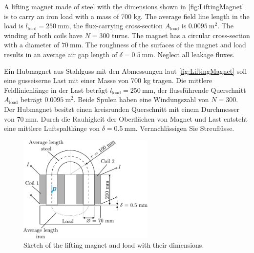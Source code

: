 

A lifting magnet made of steel with the dimensions shown in \autoref{fig:LiftingMagnet} is to carry an iron load with a mass of 700 kg. The average field line length in the load is $l_{\mathrm{load}} = \SI{250}{\milli\metre}$, the flux-carrying cross-section $A_{\mathrm{load}}$ is $\SI{0.0095}{\metre^2}$. The winding of both coils have ${N = 300}$ turns. The magnet has a circular cross-section with a diameter of $\SI{70}{\milli\metre}$. The roughness of the surfaces of the magnet and load results in an average air gap length of $\delta = \SI{0.5}{\milli\metre}$. Neglect all leakage fluxes.





\begin{germanblock}
    Ein Hubmagnet aus Stahlguss mit den Abmessungen laut \autoref{fig:LiftingMagnet} soll eine gusseiserne Last mit einer Masse von 700 kg tragen. Die mittlere Feldlinienlänge in der Last beträgt $l_{\mathrm{load}} = \SI{250}{\milli\metre}$, der flussführende Querschnitt $A_{\mathrm{load}}$ beträgt $\SI{0,0095}{\metre^2}$. Beide Spulen haben eine Windungszahl von ${N = 300}$. Der Hubmagnet besitzt einen kreisrunden Querschnitt mit einem Durchmesser von $\SI{70}{\milli\metre}$. Durch die Rauhigkeit der Oberflächen von Magnet und Last entsteht eine mittlere Luftspaltlänge von $\delta = \SI{0,5}{\milli\metre}$. Vernachlässigen Sie Streuflüsse.
\end{germanblock}

\begin{figure}[h!]
    \centering
    \includegraphics[width=0.6\textwidth]{fig/LiftingMagnet.pdf}
    \caption{Sketch of the lifting magnet and load with their dimensions.}
    \label{fig:LiftingMagnet}
\end{figure}




